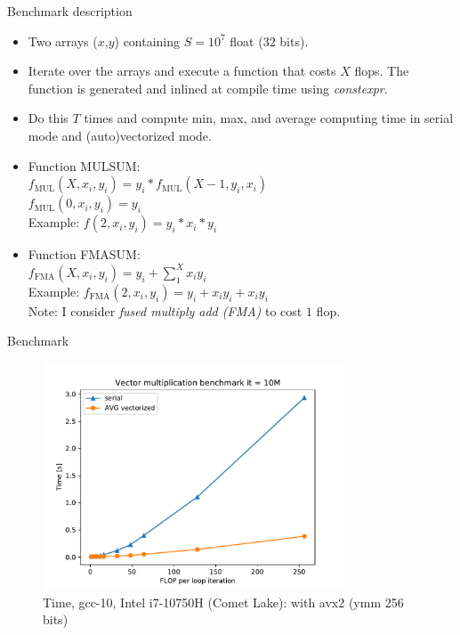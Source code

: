 \documentclass{beamer}
\begin{document}
\begin{frame}{Benchmark description}
    \begin{itemize}
        \item Two arrays ($x$,$y$) containing $S = 10^7$ float (32 bits).
        \item Iterate over the arrays and execute a function that costs $X$ flops. The function is generated and inlined at compile time using \textit{constexpr}.
        \item Do this $T$ times and compute min, max, and average computing time in serial mode and (auto)vectorized mode.
        \item<2-> Function MULSUM: \\
        $f_{\text{MUL}}(X, x_i, y_i) = y_i * f_{\text{MUL}}(X-1, y_i, x_i)$\\
        $f_{\text{MUL}}(0, x_i, y_i) = y_i$\\
        Example: $f(2, x_i, y_i)=y_i*x_i*y_i$
        \item<3-> Function FMASUM:\\
        $f_{\text{FMA}}(X, x_i, y_i) = y_i + \sum_1^X x_iy_i$\\
        Example: $f_{\text{FMA}}(2, x_i, y_i)=y_i+x_iy_i + x_iy_i$\\
        Note: I consider \textit{fused multiply add (FMA)} to cost $1$ flop.
    \end{itemize}
\end{frame}

\begin{frame}{Benchmark}
\begin{figure}
    \includegraphics[width=9cm, center]{gcc/MUL/time_vec_vs_ser_vector_op.pdf}
    \caption{Time, gcc-10, Intel i7-10750H (Comet Lake): with avx2 (ymm 256 bits)}
    \label{fig:time}
\end{figure}
\end{frame}
\end{document}
